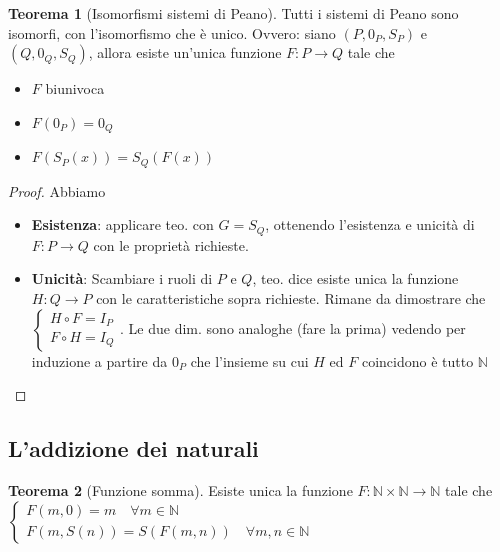 \documentclass[a4paper,10pt]{article}
\theoremstyle{definition}
\newcommand{\na}{\mathbb{N}} %
\theoremstyle{indentdefinition}
\theoremstyle{indentpostulate}
\theoremstyle{indenttheorem}
\newtheorem{thm}{Teorema}[section]
\theoremstyle{myremark}
\theoremstyle{indentgeneral}
\newenvironment{myboxed} 
{\noindent\begin{lrbox}{\mybox}\begin{minipage}{\textwidth}}
{\end{minipage}\end{lrbox}\fbox{\usebox{\mybox}}}
\begin{document}
\begin{myboxed}
\begin{thm}[Isomorfismi sistemi di Peano]
    Tutti i sistemi di Peano sono isomorfi, con l'isomorfismo che è unico. Ovvero: siano $(P,0_P,S_P)$ e $(Q,0_Q,S_Q)$, allora esiste un'unica funzione $F:P\to Q$ tale che
    \begin{itemize}
        \item $F$ biunivoca
        \item $F(0_P)=0_Q$
        \item $F(S_P(x))=S_Q(F(x))$
    \end{itemize}
\end{thm}
\end{myboxed}
\begin{proof}
    Abbiamo
    \begin{itemize}
        \item \textbf{Esistenza}: applicare teo.  con $G=S_Q$, ottenendo l'esistenza e unicità di $F:P\to Q$ con le proprietà richieste.
        \item \textbf{Unicità}: Scambiare i ruoli di $P$ e $Q$, teo.  dice esiste unica la funzione $H:Q\to P$ con le caratteristiche sopra richieste. Rimane da dimostrare che $\begin{cases}
            H\circ F=I_P\\
            F \circ H =I_Q
        \end{cases}$. Le due dim. sono analoghe (fare la prima) vedendo per induzione a partire da $0_P$ che l'insieme su cui $H$ ed $F$ coincidono è tutto $\na$
    \end{itemize}
\end{proof}

\subsection{L’addizione dei naturali}
\begin{myboxed}
    \begin{thm}[Funzione somma]
        Esiste unica la funzione $F:\mathbb{N}\times \na \to \na$ tale che $\begin{cases}
            F(m,0)=m \quad \forall m\in \na \\
            F(m,S(n))=S(F(m,n)) \quad \forall m,n\in\na
        \end{cases}$ 
    \end{thm}
\end{myboxed}
\end{document}
